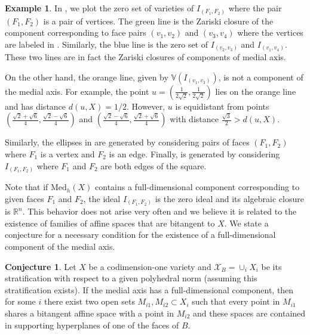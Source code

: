 \documentclass{article}
\numberwithin{theorem}{section}
\theoremstyle{definition}
\newtheorem{example}[theorem]{Example}
\newtheorem{conjecture}[theorem]{Conjecture}
\theoremstyle{example_contd}
\newcommand{\X}{\mathcal{X}}
\newcommand{\RR}{\mathbb{R}}
\newcommand{\med}{\mathrm{Med}_h}
\begin{document}
\begin{example}
In , we plot the zero set of varieties of $I_{(F_1,F_2)}$ where the pair $(F_1, F_2)$ is a pair of vertices. The green line is the Zariski closure of the component corresponding to face pairs $(v_1,v_2)$ and $(v_3,v_4)$ where the vertices are labeled in . Similarly, the blue line is the zero set of $I_{(v_2,v_3)}$ and $I_{(v_1,v_4)}$. These two lines are in fact the Zariski closures of components of medial axis. 

On the other hand, the orange line, given by $\mathbb{V}(I_{(v_1,v_3)})$, is not a component of the medial axis. For example, the point $u=\left(\frac{1}{2\sqrt{2}},\frac{1}{2\sqrt{2}}\right)$ lies on the orange line and has distance $d(u,X)=1/2$. However, $u$ is equidistant from points $\left(\frac{\sqrt{2}+\sqrt{6}}{4}, \frac{\sqrt{2}-\sqrt{6}}{4}\right)$ and $\left(\frac{\sqrt{2}-\sqrt{6}}{4}, \frac{\sqrt{2}+\sqrt{6}}{4}\right)$ with distance $\frac{\sqrt{3}}{2}>d(u,X)$. 

Similarly, the ellipses in  are generated by considering pairs of faces $(F_1,F_2)$ where $F_1$ is a vertex and $F_2$ is an edge. 
Finally,  is generated by considering $I_{(F_1,F_2)}$ where $F_1$ and $F_2$ are both edges of the square.
\end{example}





Note that if $\med(X)$ contains a full-dimensional component corresponding to given faces $F_1$ and $F_2$, the ideal $I_{(F_1,F_2)}$ is the zero ideal and its algebraic closure is $\RR^n$. This behavior does not arise very often and we believe it is related to the existence of families of affine spaces that are bitangent to $X$. We state a conjecture for a necessary condition for the existence of a full-dimensional component of the medial axis. 

\begin{conjecture}\label{conj:fulldimcomp}
	Let $X$ be a codimension-one variety and $\X_B=\cup_{i}X_i$ be its stratification with respect to a given polyhedral norm (assuming this stratification exists). If the medial axis has a full-dimensional component, then for some $i$ there exist two open sets $M_{i1},M_{i2}\subset X_i$ such that every point in $M_{i1}$ shares a bitangent affine space with a point in $M_{i2}$ and these spaces are contained in supporting hyperplanes of one of the faces of $B$.
\end{conjecture}
\end{document}
